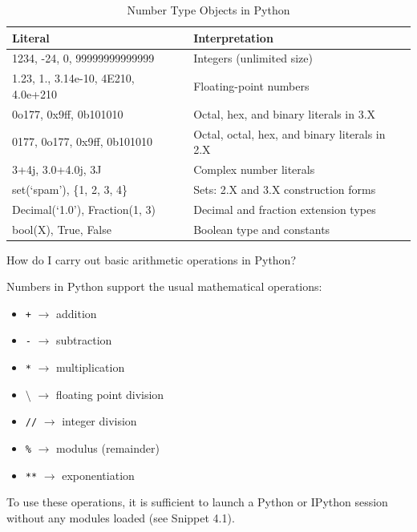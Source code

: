 \documentclass[a4paper,11pt]{book}
\newcommand{\question}[1]{%
    \begin{tcolorbox}[colback=comp_c!10,colframe=comp_c,sidebyside align=top,width=\linewidth,before skip=1ex]
        #1
    \end{tcolorbox}
    \switchcolumn%
}
\newcommand{\note}[1]{%
    \begin{tcolorbox}[colback=white!0,colframe=white!10,width=\linewidth,before skip=1ex]
        #1
    \end{tcolorbox}
}
\begin{document}
\begin{table}[!htbp]
	\centering
	\caption{Number Type Objects in Python}
	\label{tab:number_types_in_python}
	\begin{tabular}{ll}
		\toprule \toprule
		Literal & Interpretation\\
		\midrule
		 1234, -24, 0, 99999999999999 & Integers (unlimited size)\\
		 1.23, 1., 3.14e-10, 4E210, 4.0e+210 & Floating-point numbers \\
		 0o177, 0x9ff, 0b101010 & Octal, hex, and binary literals in 3.X \\
		 0177, 0o177, 0x9ff, 0b101010 & Octal, octal, hex, and binary literals in 2.X \\
		 3+4j, 3.0+4.0j, 3J & Complex number literals \\
		 set(`spam'), \{1, 2, 3, 4\} & Sets: 2.X and 3.X construction forms\\ Decimal(`1.0'), Fraction(1, 3) & Decimal and fraction extension types\\
		 bool(X), True, False & Boolean type and constants\\
		 \bottomrule
	\end{tabular}
\end{table}
\clearpage

\begin{paracol}{2}
	\question{\raggedright How do I carry out basic arithmetic operations in Python?}
	\note{Numbers in Python support the usual mathematical operations:
		\begin{itemize}
			\item \texttt{+} $\rightarrow$ addition
			\item \texttt{-} $\rightarrow$ subtraction
			\item \texttt{*} $\rightarrow$ multiplication
			\item \texttt{$\setminus$} $\rightarrow$ floating point division
			\item \texttt{//} $\rightarrow$ integer division
			\item \texttt{\%} $\rightarrow$ modulus (remainder)
			\item \texttt{**} $\rightarrow$ exponentiation
		\end{itemize}
		 To use these operations, it is sufficient to launch a  Python or IPython session without any modules loaded (see Snippet 4.1).}
\end{paracol}
\end{document}
